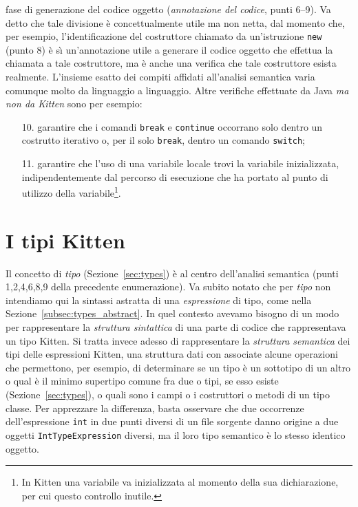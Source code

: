 fase di generazione del codice oggetto (\emph{annotazione del codice},
punti 6--9). Va detto che tale
divisione \`e concettualmente utile ma non netta, dal momento che, per
esempio, l'identificazione del costruttore chiamato da un'istruzione
\texttt{new} (punto 8) \`e s\`{\i} un'annotazione utile a
generare il codice oggetto
che effettua la chiamata a tale costruttore, ma \`e anche una verifica che
tale costruttore esista realmente. L'insieme esatto
dei compiti affidati all'analisi semantica varia comunque molto da
linguaggio a linguaggio.
Altre verifiche effettuate da Java \emph{ma non da Kitten} sono per esempio:
%
\begin{enumerate}
\item[10.] garantire che i comandi \texttt{break} e \texttt{continue}
           occorrano solo dentro un costrutto iterativo o, per il solo
           \texttt{break}, dentro un comando \texttt{switch};
\item[11.] garantire che l'uso di una variabile locale trovi la variabile
           inizializzata, indipendentemente dal percorso di esecuzione
           che ha portato al punto di utilizzo della variabile\footnote
           {In Kitten una variabile va inizializzata al momento
           della sua dichiarazione, per cui questo controllo \e inutile.}.
\end{enumerate}
%
\section{I tipi Kitten}\label{sec:semantical_types}
%
Il concetto di \emph{tipo} (Sezione~\ref{sec:types}) \`e al centro
dell'analisi semantica (punti 1,2,4,6,8,9 della precedente
enumerazione). Va subito notato che per \emph{tipo}
non intendiamo qui la sintassi
astratta di una \emph{espressione} di tipo, come nella
Sezione~\ref{subsec:types_abstract}. In quel contesto avevamo bisogno di
un modo per rappresentare la \emph{struttura sintattica} di una parte di codice
che rappresentava un tipo Kitten. Si tratta invece adesso di rappresentare
la \emph{struttura semantica} dei tipi delle espressioni Kitten,
\cioe una struttura dati con associate alcune operazioni
che permettono, per esempio, di determinare se un tipo \`e un sottotipo
di un altro o qual \`e il minimo supertipo
comune fra due o \piu tipi, se esso esiste (Sezione~\ref{sec:types}), o quali
sono i campi o i costruttori o metodi di un tipo classe.
Per apprezzare la differenza, basta osservare che
due occorrenze dell'espressione \texttt{int} in due punti diversi
di un file sorgente danno origine a due oggetti \texttt{IntTypeExpression}
diversi, ma il loro tipo semantico \`e lo stesso identico oggetto.

